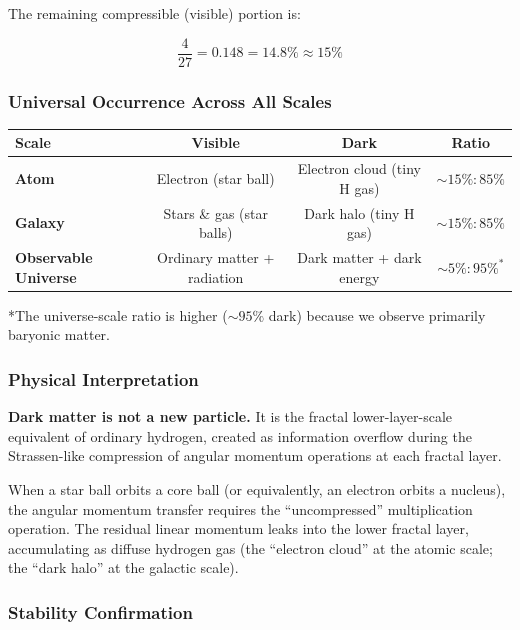 \documentclass[11pt,a4paper]{article}
\begin{document}
The remaining compressible (visible) portion is:

\begin{equation}
\frac{4}{27} = 0.148 = \boxed{14.8\%} \approx 15\%
\end{equation}

\subsubsection{Universal Occurrence Across All Scales}

\begin{table}[h]
\centering
\begin{tabular}{|l|c|c|c|}
\hline
\textbf{Scale} & \textbf{Visible} & \textbf{Dark} & \textbf{Ratio} \\
\hline
\textbf{Atom} & Electron (star ball) & Electron cloud (tiny H gas) & $\sim 15\% : 85\%$ \\
\hline
\textbf{Galaxy} & Stars \& gas (star balls) & Dark halo (tiny H gas) & $\sim 15\% : 85\%$ \\
\hline
\textbf{Observable Universe} & Ordinary matter + radiation & Dark matter + dark energy & $\sim 5\% : 95\%^*$ \\
\hline
\end{tabular}
\vspace{0.3cm}

*The universe-scale ratio is higher ($\sim 95\%$ dark) because we observe primarily baryonic matter.
\end{table}

\subsubsection{Physical Interpretation}

\textbf{Dark matter is not a new particle.} It is the fractal lower-layer-scale equivalent of ordinary hydrogen, created as information overflow during the Strassen-like compression of angular momentum operations at each fractal layer.

When a star ball orbits a core ball (or equivalently, an electron orbits a nucleus), the angular momentum transfer requires the ``uncompressed'' multiplication operation. The residual linear momentum leaks into the lower fractal layer, accumulating as diffuse hydrogen gas (the ``electron cloud'' at the atomic scale; the ``dark halo'' at the galactic scale).

\subsubsection{Stability Confirmation}
\end{document}
